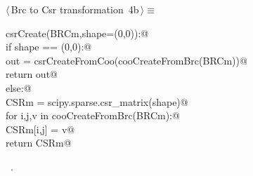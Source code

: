 \documentclass[11pt,oneside]{article}	%
\begin{document}
\begin{flushleft} \small
\begin{minipage}{\linewidth} \label{scrap6}
\protect{}$\langle\,$Brc to Csr transformation\nobreak\ {\footnotesize 4b}$\,\rangle\equiv$
\vspace{-1ex}
\begin{list}{}{} \item
\mbox{}\verb@def csrCreate(BRCm,shape=(0,0)):@\\
\mbox{}\verb@    if shape == (0,0):@\\
\mbox{}\verb@        out = csrCreateFromCoo(cooCreateFromBrc(BRCm))@\\
\mbox{}\verb@        return out@\\
\mbox{}\verb@    else:@\\
\mbox{}\verb@        CSRm = scipy.sparse.csr_matrix(shape)@\\
\mbox{}\verb@        for i,j,v in cooCreateFromBrc(BRCm):@\\
\mbox{}\verb@            CSRm[i,j] = v@\\
\mbox{}\verb@        return CSRm@\\
\mbox{}\verb@@{\NWsep}
\end{list}
\vspace{-1ex}
\footnotesize\addtolength{\baselineskip}{-1ex}
\begin{list}{}{\setlength{\itemsep}{-\parsep}\setlength{\itemindent}{-\leftmargin}}
\item \NWtxtMacroRefIn\ .
\end{list}
\end{minipage}\\[4ex]
\end{flushleft}
\end{document}
